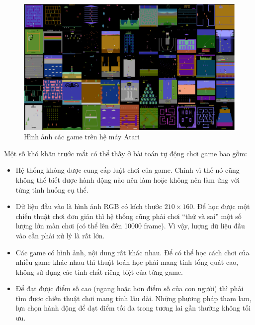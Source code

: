 \begin{figure}
	\centering
	\includegraphics[width=\textwidth]{ale_55_games}
	\caption{Hình ảnh các game trên hệ máy Atari}
	\label{Ale55Games}
\end{figure}

Một số khó khăn trước mắt có thể thấy ở bài toán tự động chơi game bao gồm:
\begin{itemize}
	\item Hệ thống không được cung cấp luật chơi của game. 
	Chính vì thế nó cũng không thể biết được hành động nào nên làm hoặc không nên làm ứng với từng tình huống cụ thể.
	\item Dữ liệu đầu vào là hình ảnh RGB có kích thước $210\times160$. 
	Để học được một chiến thuật chơi đơn giản thì hệ thống cũng phải chơi ``thử và sai'' một số lượng lớn màn chơi (có thể lên đến 10000 frame). 
	Vì vậy, lượng dữ liệu đầu vào cần phải xử lý là rất lớn.
	\item Các game có hình ảnh, nội dung rất khác nhau. 
	Để có thể học cách chơi của nhiều game khác nhau thì thuật toán học phải mang tính tổng quát cao, không sử dụng các tính chất riêng biệt của từng game.
	\item Để đạt được điểm số cao (ngang hoặc hơn điểm số của con người) thì phải tìm được chiến thuật chơi mang tính lâu dài. 
	Những phương pháp tham lam, lựa chọn hành động để đạt điểm tối đa trong tương lai gần thường không tối ưu.
\end{itemize}



